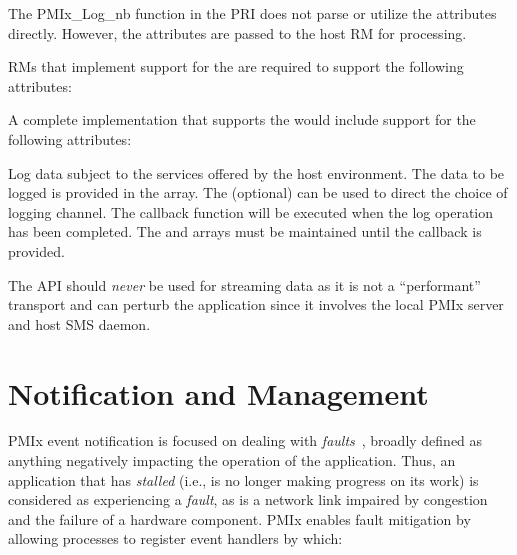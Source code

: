 \priattr
The PMIx\_Log\_nb function in the \ac{PRI} does not parse or utilize the attributes directly. However, the attributes are passed to the host RM for processing.

\reqattr
\acp{RM} that implement support for the  are required to support the following attributes:


\optattr
A complete implementation that supports the  would include support for the following attributes:


\descr

Log data subject to the services offered by the host environment. The data to be logged is provided in the  array. The (optional)  can be used to direct the choice of logging channel.
The callback function will be executed when the log operation has been completed. The  and  arrays must be maintained until the callback is provided.

\adviceuserstart
The  API should \emph{never} be used for streaming data as it is not a ``performant'' transport and can perturb the application since it involves the local \ac{PMIx} server and host \ac{SMS} daemon.
\adviceuserend


\section{Notification and Management}
\label{chap:api_event:notify}

\ac{PMIx} event notification  is focused on dealing with \textit{faults}~\cite{event1,event2}, broadly defined as anything negatively impacting the operation of the application. Thus, an application that has \textit{stalled} (i.e., is no longer making progress on its work) is considered as experiencing a \textit{fault}, as is a network link impaired by congestion and the failure of a hardware component. \ac{PMIx} enables fault mitigation by allowing processes to register event handlers by which:


